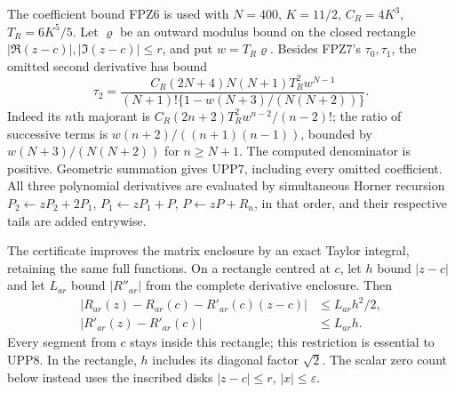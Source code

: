 \documentclass[11pt]{article}
\begin{document}
The coefficient bound FPZ6 is used with $N=400$, $K=11/2$,
$C_R=4K^3$, $T_R=6K^5/5$. Let $\varrho$ be an outward modulus
bound on the closed rectangle
$|\Re(z-c)|,|\Im(z-c)|\le r$, and put $w=T_R\varrho$.
Besides FPZ7's $\tau_0,\tau_1$, the omitted second derivative has bound
\[
 \tau_2=
 \frac{C_R(2N+4)N(N+1)T_R^2w^{N-1}}
 {(N+1)!\{1-w(N+3)/(N(N+2))\}}.
 \tag{UPP7}
\]
Indeed its $n$th majorant is
$C_R(2n+2)T_R^2w^{n-2}/(n-2)!$; the ratio of successive terms is
$w(n+2)/((n+1)(n-1))$, bounded by $w(N+3)/(N(N+2))$ for
$n\ge N+1$. The computed denominator is positive. Geometric
summation gives UPP7, including every omitted coefficient.
All three polynomial derivatives are evaluated by simultaneous Horner
recursion $P_2\leftarrow zP_2+2P_1$,
$P_1\leftarrow zP_1+P$, $P\leftarrow zP+R_n$, in that order,
and their respective tails are added entrywise.

The certificate improves the matrix enclosure by an exact Taylor
integral, retaining the same full functions. On a rectangle centred
at $c$, let $h$ bound $|z-c|$ and let $L_{ar}$ bound $|R''_{ar}|$
from the complete derivative enclosure. Then
\[
 \begin{aligned}
 |R_{ar}(z)-R_{ar}(c)-R'_{ar}(c)(z-c)|&\le L_{ar}h^2/2,\\
 |R'_{ar}(z)-R'_{ar}(c)|&\le L_{ar}h.
 \end{aligned}\tag{UPP8}
\]
Every segment from $c$ stays inside this rectangle; this restriction
is essential to UPP8. In the rectangle, $h$ includes its diagonal
factor $\sqrt2$. The scalar zero count below instead uses the
inscribed disks $|z-c|\le r$, $|x|\le\varepsilon$.
\end{document}
